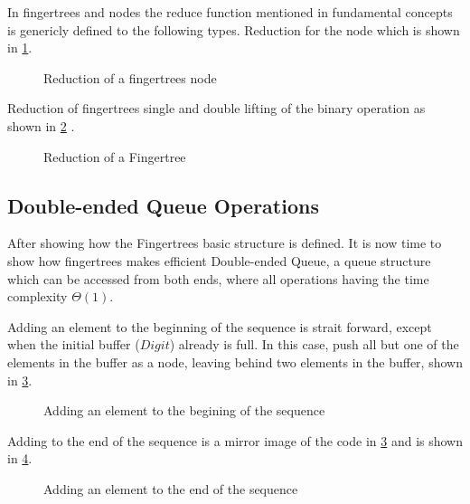 In fingertrees and nodes the reduce function mentioned in fundamental concepts
is genericly defined to the following types. 
Reduction for the node which is shown in \cref{fig:reductionNode}.

\begin{figure}[h!]

\caption{Reduction of a fingertrees node \label{fig:reductionNode}}
\end{figure}

Reduction of fingertrees single and double lifting of the binary operation as
shown in \cref{fig:reductionFingerTree}
\cite{fingertree}.

\begin{figure}[h!]

\caption{Reduction of a Fingertree \label{fig:reductionFingerTree}}
\end{figure}

\subsection{Double-ended Queue Operations}
After showing how the Fingertrees basic structure is defined. It is now time to
show how fingertrees makes efficient Double-ended Queue, a queue structure which
can be accessed from both ends, where all operations having the time complexity
$\Theta(1)$.

Adding an element to the beginning of the sequence is strait forward, except
when the initial buffer ($Digit$) already is full. In this case, push all but
one of the elements in the buffer as a node, leaving behind two elements in the
buffer, shown in \cref{fig:AddFirst}.

\begin{figure}[h!]

\caption{Adding an element to the begining of the sequence \label{fig:AddFirst}}
\end{figure}

Adding to the end of the sequence is a mirror image of the code in
\cref{fig:AddFirst} and is shown in \cref{fig:AddLast}.

\begin{figure}[h!]

\caption{Adding an element to the end of the sequence \label{fig:AddLast}}
\end{figure}

